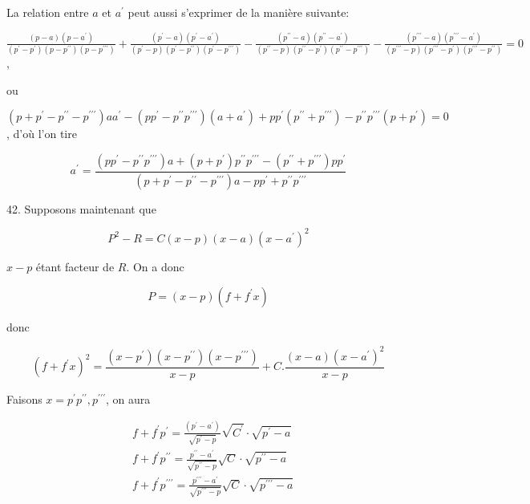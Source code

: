 \documentclass{article}
\begin{document}
La relation entre \(a\) et \(a^{\prime}\) peut aussi s'exprimer de la manière suivante:

\(\frac{(p-a)\left(p-a^{\prime}\right)}{\left(p^{\prime}-p^{\prime}\right)\left(p-p^{\prime \prime}\right)\left(p-p^{\prime \prime \prime}\right)}+\frac{\left(p^{\prime}-a\right)\left(p^{\prime}-a^{\prime}\right)}{\left(p^{\prime}-p\right)\left(p^{\prime}-p^{\prime \prime}\right)\left(p^{\prime}-p^{\prime \prime \prime}\right)}-\frac{\left(p^{\prime \prime}-a\right)\left(p^{\prime \prime}-a^{\prime}\right)}{\left(p^{\prime \prime}-p\right)\left(p^{\prime \prime}-p^{\prime}\right)\left(p^{\prime \prime}-p^{\prime \prime \prime}\right)}-\frac{\left(p^{\prime \prime \prime}-a\right)\left(p^{\prime \prime \prime}-a^{\prime}\right)}{\left(p^{\prime \prime \prime}-p\right)\left(p^{\prime \prime \prime}-p^{\prime}\right)\left(p^{\prime \prime \prime}-p^{\prime \prime}\right)}=0\),

ou

\(\left(p+p^{\prime}-p^{\prime \prime}-p^{\prime \prime \prime}\right) a a^{\prime}-\left(p p^{\prime}-p^{\prime \prime} p^{\prime \prime \prime}\right)\left(a+a^{\prime}\right)+p p^{\prime}\left(p^{\prime \prime}+p^{\prime \prime \prime}\right)-p^{\prime \prime} p^{\prime \prime \prime}\left(p+p^{\prime}\right)=0\), d'où l'on tire

\[
a^{\prime}=\frac{\left(p p^{\prime}-p^{\prime \prime} p^{\prime \prime \prime}\right) a+\left(p+p^{\prime}\right) p^{\prime \prime} p^{\prime \prime \prime}-\left(p^{\prime \prime}+p^{\prime \prime \prime}\right) p p^{\prime}}{\left(p+p^{\prime}-p^{\prime \prime}-p^{\prime \prime \prime}\right) a-p p^{\prime}+p^{\prime \prime} p^{\prime \prime \prime}}
\]

42. Supposons maintenant que

\[
P^{2}-R=C(x-p)(x-a)\left(x-a^{\prime}\right)^{2}
\]

\(x-p\) étant facteur de \(R\). On a donc

\[
P=(x-p)\left(f+f^{\prime} x\right)
\]

donc

\[
\left(f+f^{\prime} x\right)^{2}=\frac{\left(x-p^{\prime}\right)\left(x-p^{\prime \prime}\right)\left(x-p^{\prime \prime \prime}\right)}{x-p}+C . \frac{(x-a)\left(x-a^{\prime}\right)^{2}}{x-p}
\]

Faisons \(x=p^{\prime} p^{\prime \prime}, p^{\prime \prime \prime}\), on aura

\[
\begin{aligned}
& f+f^{\prime} p^{\prime}=\frac{\left(p^{\prime}-a^{\prime}\right)}{\sqrt{p^{\prime}-p}} \sqrt{C^{\prime}} \cdot \sqrt{p^{\prime}-a} \\
& f+f^{\prime} p^{\prime \prime}=\frac{p^{\prime \prime}-a^{\prime}}{\sqrt{p^{\prime \prime}-p}} \sqrt{C} \cdot \sqrt{p^{\prime \prime}-a} \\
& f+f^{\prime} p^{\prime \prime \prime}=\frac{p^{\prime \prime \prime}-a^{\prime}}{\sqrt{p^{\prime \prime \prime}-p}} \sqrt{C} \cdot \sqrt{p^{\prime \prime \prime}-a}
\end{aligned}
\]
\end{document}
